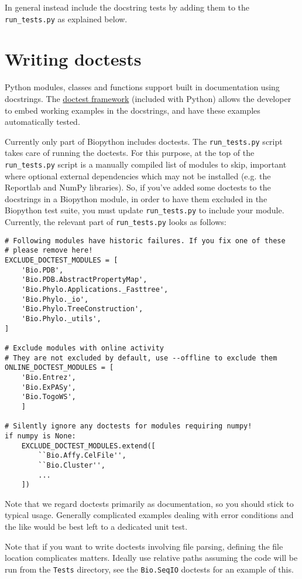 In general instead include the docstring tests by adding them to the
\verb|run_tests.py| as explained below.

\section{Writing doctests}
\label{sec:doctest}

Python modules, classes and functions support built in documentation using
docstrings.  The \href{https://docs.python.org/3/library/doctest.html}{doctest
framework} (included with Python) allows the developer to embed working
examples in the docstrings, and have these examples automatically tested.

Currently only part of Biopython includes doctests. The \verb|run_tests.py|
script takes care of running the doctests. For this purpose, at the top of
the \verb|run_tests.py| script is a manually compiled list of modules to
skip, important where optional external dependencies which may
not be installed (e.g. the Reportlab and NumPy libraries).  So, if you've
added some doctests to the docstrings in a Biopython module, in order to
have them excluded in the Biopython test suite, you must update
\verb|run_tests.py| to include your module. Currently, the relevant part
of \verb|run_tests.py| looks as follows:

\begin{verbatim}
# Following modules have historic failures. If you fix one of these
# please remove here!
EXCLUDE_DOCTEST_MODULES = [
    'Bio.PDB',
    'Bio.PDB.AbstractPropertyMap',
    'Bio.Phylo.Applications._Fasttree',
    'Bio.Phylo._io',
    'Bio.Phylo.TreeConstruction',
    'Bio.Phylo._utils',
]

# Exclude modules with online activity
# They are not excluded by default, use --offline to exclude them
ONLINE_DOCTEST_MODULES = [
    'Bio.Entrez',
    'Bio.ExPASy',
    'Bio.TogoWS',
    ]

# Silently ignore any doctests for modules requiring numpy!
if numpy is None:
    EXCLUDE_DOCTEST_MODULES.extend([
        ``Bio.Affy.CelFile'',
        ``Bio.Cluster'',
        ...
    ])
\end{verbatim}

Note that we regard doctests primarily as documentation, so you should
stick to typical usage. Generally complicated examples dealing with error
conditions and the like would be best left to a dedicated unit test.

Note that if you want to write doctests involving file parsing, defining
the file location complicates matters.  Ideally use relative paths assuming
the code will be run from the \verb|Tests| directory, see the
\verb|Bio.SeqIO| doctests for an example of this.

